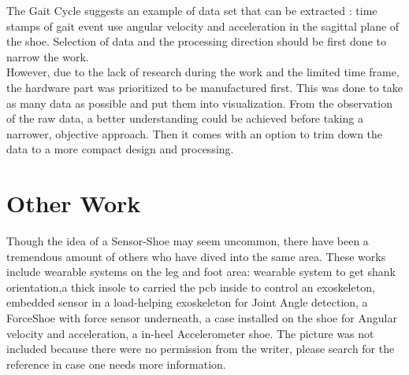\documentclass[12 pt, a4paper]{thesis}
\begin{document}
The Gait Cycle suggests an example of data set that can be extracted : time stamps of gait event\cite{Shuo} use angular velocity and acceleration in the sagittal plane of the shoe. Selection of data and the processing direction should be first done to narrow the work.\\
However, due to the lack of research during the work and the limited time frame, the hardware part was prioritized to be manufactured first. This was done to take as many data as possible and put them into visualization. From the observation of the raw data, a better understanding could be achieved before taking a narrower, objective approach. Then it comes with an option to trim down the data to a more compact design and processing. 
\section{Other Work}
Though the idea of a Sensor-Shoe may seem uncommon, there have been a tremendous amount of others who have dived into the same area. These works include wearable systems on the leg and foot area: wearable system to get shank orientation\cite{Monaghan},a thick insole to carried the pcb inside to control an exoskeleton\cite{Kim}, embedded sensor in a load-helping exoskeleton for Joint Angle detection\cite{Zhang}, a ForceShoe with force sensor underneath\cite{Mohamed}, a case installed on the shoe for Angular velocity and acceleration\cite{Shuo}, a in-heel Accelerometer shoe\cite{Nilsson}. The picture was not included because there were no permission from the writer, please search for the reference in case one needs more information.\\
\end{document}

